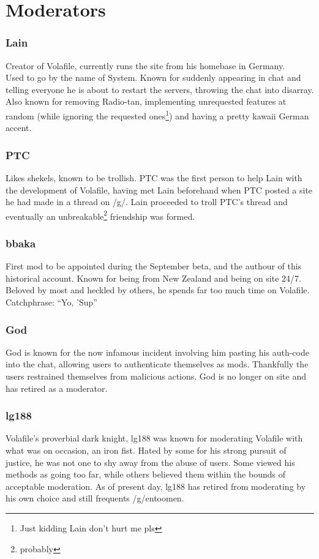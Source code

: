 \documentclass[12pt]{report}
\begin{document}
{\section{Moderators}


\subsubsection{Lain}
	Creator of Volafile, currently runs the site from his homebase in Germany. \\
	Used to go by the name of System. Known for suddenly appearing in chat and telling everyone he is about to restart the servers, throwing  the chat into disarray. Also known for removing Radio-tan, implementing unrequested features at random (while ignoring the requested ones\footnote{Just kidding Lain don't hurt me pls}) and having a pretty kawaii German accent.
	
	
\subsubsection{PTC}
	Likes shekels, known to be trollish. PTC was the first person to help Lain with the development of Volafile, having met Lain beforehand when PTC posted a site he had made in a thread on /g/. Lain proceeded to troll PTC's thread and eventually an unbreakable\footnote{probably} friendship was formed.
	
	
\subsubsection{bbaka}
	First mod to be appointed during the September beta, and the authour of this historical account. Known for being from New Zealand and being on site 24/7. Beloved by most and heckled by others, he spends far too much time on Volafile.
	Catchphrase: ``Yo, 'Sup''
	
\subsubsection{God}
	God is known for the now infamous incident involving him pasting his auth-code into the chat, allowing users to authenticate themselves as mods. Thankfully the users restrained themselves from malicious actions. God is no longer on site and has retired as a moderator.
	
	 
\subsubsection{lg188}
Volafile's proverbial dark knight, lg188 was known for moderating Volafile with what was on occasion, an iron fist. Hated by some for his strong pursuit of justice, he was not one to shy away from the abuse of users. Some viewed his methods as going too far, while others believed them within the bounds of acceptable moderation. As of present day, lg188 has retired from moderating by his own choice and still frequents /g/entoomen.
	
}
\end{document}
